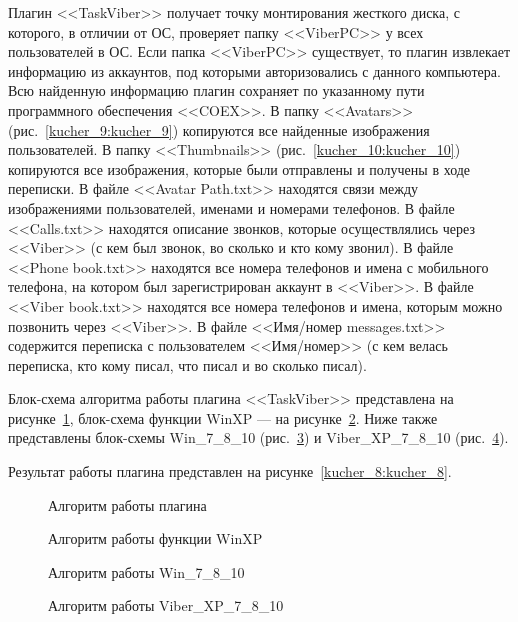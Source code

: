 Плагин <<TaskViber>> получает точку монтирования жесткого диска, с которого, в отличии от ОС, проверяет папку <<ViberPC>> у всех пользователей в ОС. Если папка <<ViberPC>> существует, то плагин извлекает информацию из аккаунтов, под которыми авторизовались с данного компьютера. Всю найденную информацию плагин сохраняет по указанному пути программного обеспечения <<COEX>>. В папку <<Avatars>> (рис.~\ref{kucher_9:kucher_9}) копируются все найденные изображения пользователей. В папку <<Thumbnails>> (рис.~\ref{kucher_10:kucher_10}) копируются все изображения, которые были отправлены и получены в ходе переписки. В файле <<Avatar Path.txt>> находятся связи между изображениями пользователей, именами и номерами телефонов. В файле <<Calls.txt>> находятся описание звонков, которые осуществлялись через <<Viber>> (с кем был звонок, во сколько и кто кому звонил). В файле <<Phone book.txt>> находятся все номера телефонов и имена с мобильного телефона, на котором был зарегистрирован аккаунт в <<Viber>>. В файле <<Viber book.txt>> находятся все номера телефонов и имена, которым можно позвонить через <<Viber>>. В файле <<Имя/номер messages.txt>> содержится переписка с пользователем <<Имя/номер>> (с кем велась переписка, кто кому писал, что писал и во сколько писал).

Блок-схема алгоритма работы плагина <<TaskViber>> представлена на рисунке~\ref{kucher_4:kucher_4}, блок-схема функции WinXP --- на рисунке~\ref{kucher_5:kucher_5}. Ниже также представлены блок-схемы Win\_7\_8\_10 (рис.~\ref{kucher_6:kucher_6}) и Viber\_XP\_7\_8\_10 (рис.~\ref{kucher_7:kucher_7}).

Результат работы плагина представлен на рисунке~\ref{kucher_8:kucher_8}.
 

\begin{figure}[h!]
\caption{ Алгоритм работы плагина }
\label{kucher_4:kucher_4}
\end{figure} 
  
\begin{figure}[h!]
\caption{ Алгоритм работы функции WinXP }
\label{kucher_5:kucher_5}
\end{figure} 

\begin{figure}[ht]
\caption{ Алгоритм работы Win\_7\_8\_10 }
\label{kucher_6:kucher_6}
\end{figure} 

\begin{figure}[h!]
\caption{ Алгоритм работы Viber\_XP\_7\_8\_10 }
\label{kucher_7:kucher_7}
\end{figure} 

